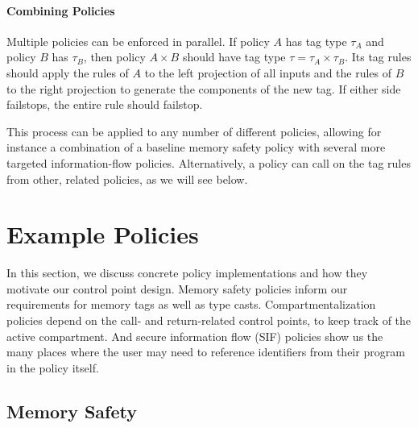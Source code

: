 \documentclass{llncs}
\begin{document}


\paragraph*{Combining Policies}

Multiple policies can be enforced in parallel. If policy \(A\) has tag type \(\tau_A\)
and policy \(B\) has \(\tau_B\), then policy \(A \times B\) should have tag type
\(\tau = \tau_A \times \tau_B\). Its tag rules should apply the rules of \(A\) to
the left projection of all inputs and the rules of \(B\) to the right projection
to generate the components of the new tag. If either side failstops, the entire
rule should failstop.

This process can be applied to any number of different policies, allowing for instance
a combination of a baseline memory safety policy with several more targeted
information-flow policies. Alternatively, a policy can call on the tag rules
from other, related policies, as we will see below.

\section{Example Policies}
\label{sec:policies}

In this section, we discuss concrete policy implementations and how 
they motivate our control point design. Memory safety policies
inform our requirements for memory tags as well as type casts. Compartmentalization
policies depend on the call- and return-related control points, to keep track of the
active compartment. And secure information flow (SIF) policies show us the many places
where the user may need to reference identifiers from their program in the policy itself.

\subsection{Memory Safety}
\end{document}
